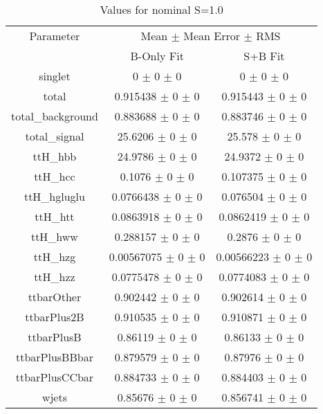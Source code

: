 \begin{table}
\centering
\caption{Values for nominal S=1.0}
\begin{tabular}{ccc}
\toprule
Parameter 	& \multicolumn{2}{c}{Mean $\pm$ Mean Error $\pm$ RMS}\\
 	& B-Only Fit & S+B Fit\\
\midrule
singlet 	& \num{0} $\pm$ \num{0} $\pm$ \num{0} 	& \num{0} $\pm$ \num{0} $\pm$ \num{0}\\
total 	& \num{0.915438} $\pm$ \num{0} $\pm$ \num{0} 	& \num{0.915443} $\pm$ \num{0} $\pm$ \num{0}\\
total\_background 	& \num{0.883688} $\pm$ \num{0} $\pm$ \num{0} 	& \num{0.883746} $\pm$ \num{0} $\pm$ \num{0}\\
total\_signal 	& \num{25.6206} $\pm$ \num{0} $\pm$ \num{0} 	& \num{25.578} $\pm$ \num{0} $\pm$ \num{0}\\
ttH\_hbb 	& \num{24.9786} $\pm$ \num{0} $\pm$ \num{0} 	& \num{24.9372} $\pm$ \num{0} $\pm$ \num{0}\\
ttH\_hcc 	& \num{0.1076} $\pm$ \num{0} $\pm$ \num{0} 	& \num{0.107375} $\pm$ \num{0} $\pm$ \num{0}\\
ttH\_hgluglu 	& \num{0.0766438} $\pm$ \num{0} $\pm$ \num{0} 	& \num{0.076504} $\pm$ \num{0} $\pm$ \num{0}\\
ttH\_htt 	& \num{0.0863918} $\pm$ \num{0} $\pm$ \num{0} 	& \num{0.0862419} $\pm$ \num{0} $\pm$ \num{0}\\
ttH\_hww 	& \num{0.288157} $\pm$ \num{0} $\pm$ \num{0} 	& \num{0.2876} $\pm$ \num{0} $\pm$ \num{0}\\
ttH\_hzg 	& \num{0.00567075} $\pm$ \num{0} $\pm$ \num{0} 	& \num{0.00566223} $\pm$ \num{0} $\pm$ \num{0}\\
ttH\_hzz 	& \num{0.0775478} $\pm$ \num{0} $\pm$ \num{0} 	& \num{0.0774083} $\pm$ \num{0} $\pm$ \num{0}\\
ttbarOther 	& \num{0.902442} $\pm$ \num{0} $\pm$ \num{0} 	& \num{0.902614} $\pm$ \num{0} $\pm$ \num{0}\\
ttbarPlus2B 	& \num{0.910535} $\pm$ \num{0} $\pm$ \num{0} 	& \num{0.910871} $\pm$ \num{0} $\pm$ \num{0}\\
ttbarPlusB 	& \num{0.86119} $\pm$ \num{0} $\pm$ \num{0} 	& \num{0.86133} $\pm$ \num{0} $\pm$ \num{0}\\
ttbarPlusBBbar 	& \num{0.879579} $\pm$ \num{0} $\pm$ \num{0} 	& \num{0.87976} $\pm$ \num{0} $\pm$ \num{0}\\
ttbarPlusCCbar 	& \num{0.884733} $\pm$ \num{0} $\pm$ \num{0} 	& \num{0.884403} $\pm$ \num{0} $\pm$ \num{0}\\
wjets 	& \num{0.85676} $\pm$ \num{0} $\pm$ \num{0} 	& \num{0.856741} $\pm$ \num{0} $\pm$ \num{0}\\
\bottomrule
\end{tabular}
\end{table}